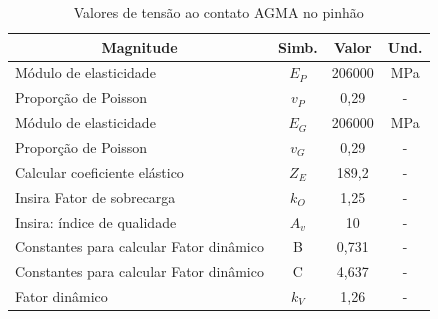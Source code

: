 \documentclass[12pt,a4paper]{article}
\begin{document}
\begin{table}[!htb]
    \centering
    \caption{{\label{tab:4} Valores de tensão ao contato AGMA no pinhão}}
    \begin{tabular}{l c c c}
\multicolumn{1}{c}{\textbf{Magnitude}}                                                                                       & \textbf{Simb.} & \textbf{Valor} & \textbf{Und.} \\ \hline
Módulo de elasticidade                                                                                                       & $E_P$             & 206000         & MPa           \\
Proporção de Poisson                                                                                                         & $v_P$             & 0,29           & -             \\
Módulo de elasticidade                                                                                                       & $E_G$             & 206000         & MPa           \\
Proporção de Poisson                                                                                                         & $v_G$             & 0,29           & -             \\
Calcular coeficiente elástico                                                                                                & $Z_E$             & 189,2          & -             \\
Insira Fator de sobrecarga                                                                                                   & $k_O$             & 1,25           & -             \\
Insira: índice de qualidade                                                                                                  & $A_v$             & 10             & -             \\
Constantes para calcular Fator dinâmico                                                                                      & B              & 0,731          & -             \\
Constantes para calcular Fator dinâmico                                                                                      & C              & 4,637          & -             \\
Fator dinâmico                                                                                                               & $k_V$             & 1,26           & -             \\

\end{tabular}
\end{table}
\end{document}
